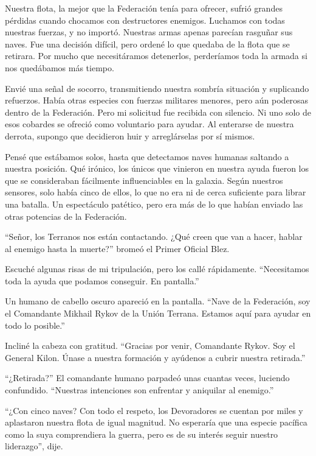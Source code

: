 \documentclass[spanish,12pt,a4paper,oneside,titlepage]{book}
\begin{document}
    Nuestra flota, la mejor que la Federación tenía para ofrecer, sufrió grandes pérdidas cuando chocamos con destructores enemigos. Luchamos con todas nuestras fuerzas, y no importó. Nuestras armas apenas parecían rasguñar sus naves. Fue una decisión difícil, pero ordené lo que quedaba de la flota que se retirara. Por mucho que necesitáramos detenerlos, perderíamos toda la armada si nos quedábamos más tiempo.

    Envié una señal de socorro, transmitiendo nuestra sombría situación y suplicando refuerzos. Había otras especies con fuerzas militares menores, pero aún poderosas dentro de la Federación. Pero mi solicitud fue recibida con silencio. Ni uno solo de esos cobardes se ofreció como voluntario para ayudar. Al enterarse de nuestra derrota, supongo que decidieron huir y arreglárselas por sí mismos.

    Pensé que estábamos solos, hasta que detectamos naves humanas saltando a nuestra posición. Qué irónico, los únicos que vinieron en nuestra ayuda fueron los que se consideraban fácilmente influenciables en la galaxia. Según nuestros sensores, solo había cinco de ellos, lo que no era ni de cerca suficiente para librar una batalla. Un espectáculo patético, pero era más de lo que habían enviado las otras potencias de la Federación.

    ``Señor, los Terranos nos están contactando. ¿Qué creen que van a hacer, hablar al enemigo hasta la muerte?'' bromeó el Primer Oficial Blez.

    Escuché algunas risas de mi tripulación, pero los callé rápidamente. ``Necesitamos toda la ayuda que podamos conseguir. En pantalla.''

    Un humano de cabello oscuro apareció en la pantalla. ``Nave de la Federación, soy el Comandante Mikhail Rykov de la Unión Terrana. Estamos aquí para ayudar en todo lo posible.''

    Incliné la cabeza con gratitud. ``Gracias por venir, Comandante Rykov. Soy el General Kilon. Únase a nuestra formación y ayúdenos a cubrir nuestra retirada.''

    ``¿Retirada?'' El comandante humano parpadeó unas cuantas veces, luciendo confundido. ``Nuestras intenciones son enfrentar y aniquilar al enemigo.''

    ``¿Con cinco naves? Con todo el respeto, los Devoradores se cuentan por miles y aplastaron nuestra flota de igual magnitud. No esperaría que una especie pacífica como la suya comprendiera la guerra, pero es de su interés seguir nuestro liderazgo'', dije.
\end{document}
